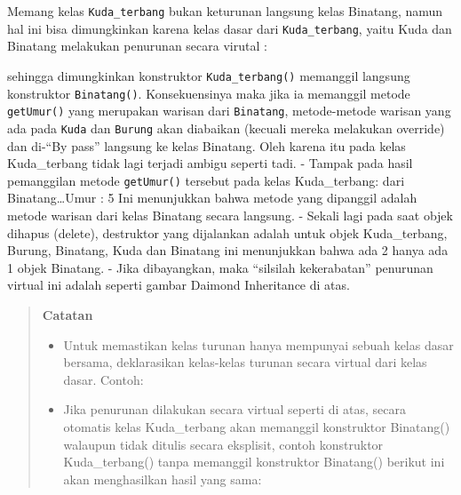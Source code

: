 Memang kelas \texttt{Kuda\_terbang} bukan keturunan langsung kelas
Binatang, namun hal ini bisa dimungkinkan karena kelas dasar dari
\texttt{Kuda\_terbang}, yaitu Kuda dan Binatang melakukan penurunan
secara virutal :



sehingga dimungkinkan konstruktor \texttt{Kuda\_terbang()} memanggil
langsung konstruktor \texttt{Binatang()}. Konsekuensinya maka jika ia
memanggil metode \texttt{getUmur()} yang merupakan warisan dari
\texttt{Binatang}, metode-metode warisan yang ada pada \texttt{Kuda} dan
\texttt{Burung} akan diabaikan (kecuali mereka melakukan override) dan
di-``By pass'' langsung ke kelas Binatang. Oleh karena itu pada kelas
Kuda\_terbang tidak lagi terjadi ambigu seperti tadi. - Tampak pada
hasil pemanggilan metode \texttt{getUmur()} tersebut pada kelas
Kuda\_terbang: dari Binatang\ldots{}Umur : 5 Ini menunjukkan bahwa
metode yang dipanggil adalah metode warisan dari kelas Binatang secara
langsung. - Sekali lagi pada saat objek dihapus (delete), destruktor
yang dijalankan adalah untuk objek Kuda\_terbang, Burung, Binatang, Kuda
dan Binatang ini menunjukkan bahwa ada 2 hanya ada 1 objek Binatang. -
Jika dibayangkan, maka ``silsilah kekerabatan'' penurunan virtual ini
adalah seperti gambar Daimond Inheritance di atas.

\begin{quotation}
 {\LARGE {}} \textbf{Catatan}
	
\begin{itemize}
\item [\ding{45}] Untuk memastikan kelas turunan hanya mempunyai sebuah kelas dasar bersama,
deklarasikan kelas-kelas turunan secara virtual dari kelas dasar. Contoh:



\item [\ding{45}] Jika penurunan dilakukan secara virtual seperti di atas, secara otomatis kelas
Kuda\_terbang akan memanggil konstruktor Binatang() walaupun tidak ditulis
secara eksplisit, contoh konstruktor Kuda\_terbang() tanpa memanggil konstruktor
Binatang() berikut ini akan menghasilkan hasil yang sama:
		

\end{itemize}

\end{quotation}




